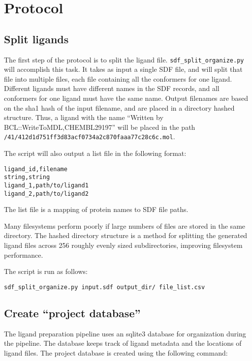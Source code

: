 \section{Protocol}

\subsection{Split ligands}

The first step of the protocol is to split the ligand file.
\texttt{sdf\_split\_organize.py} will accomplish this task. 
It takes as input a single \ac{SDF} file, and will split that file into multiple files, each file containing all the conformers for one ligand.
Different ligands must have different names in the \ac{SDF} records, and all conformers for one ligand must have the same name. 
Output filenames are based on the sha1 hash of the input filename, and are placed in a directory hashed structure.
Thus, a ligand with the name ``Written by BCL::WriteToMDL,CHEMBL29197''
will be placed in the path\\
\texttt{/41/412d1d751ff3d83acf0734a2c870faaa77c28c6c.mol}.

The script will also output a list file in the following format:

\begin{verbatim}
ligand_id,filename
string,string
ligand_1,path/to/ligand1
ligand_2,path/to/ligand2
\end{verbatim}

The list file is a mapping of protein names to \ac{SDF} file paths.

Many filesystems perform poorly if large numbers of files are stored in the same directory. 
The hashed directory structure is a method for splitting the generated ligand files across 256 roughly evenly sized subdirectories, improving filesystem performance.

The script is run as follows:

\begin{verbatim}
sdf_split_organize.py input.sdf output_dir/ file_list.csv
\end{verbatim}

\subsection{Create ``project database''}

The ligand preparation pipeline uses an sqlite3 database for organization during the pipeline.
The database keeps track of ligand metadata and the locations of ligand files.
The project database is created using the following command:

